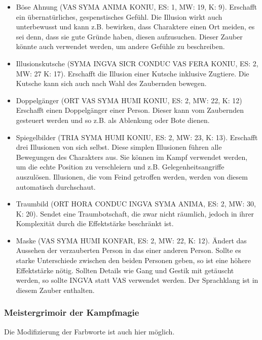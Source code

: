 \documentclass{article}
\begin{document}
\begin{itemize}
\item Böse Ahnung (VAS SYMA ANIMA KONIU, ES: 1, MW: 19, K: 9). Erschafft ein übernatürliches, gespenstisches Gefühl. Die Illusion wirkt auch unterbewusst und kann z.B. bewirken, dass Charaktere einen Ort meiden, es sei denn, dass sie gute Gründe haben, diesen aufzusuchen. Dieser Zauber könnte auch verwendet werden, um andere Gefühle zu beschreiben.
\item Illusionskutsche (SYMA INGVA SICR CONDUC VAS FERA KONIU, ES: 2, MW: 27 K: 17). Erschafft die Illusion einer Kutsche inklusive Zugtiere. Die Kutsche kann sich auch nach Wahl des Zaubernden bewegen.
\item Doppelgänger (ORT VAS SYMA HUMI KONIU, ES: 2, MW: 22, K: 12) Erschafft einen Doppelgänger einer Person. Dieser kann vom Zaubernden gesteuert werden und so z.B. als Ablenkung oder Bote dienen.
\item Spiegelbilder (TRIA SYMA HUMI KONIU, ES: 2, MW: 23, K: 13). Erschafft drei Illusionen von sich selbst. Diese simplen Illusionen führen alle Bewegungen des Charakters aus. Sie können im Kampf verwendet werden, um die echte Position zu verschleiern und z.B. Gelegenheitsangriffe auszulösen. Illusionen, die vom Feind getroffen werden, werden von diesem automatisch durchschaut.
\item Traumbild (ORT HORA CONDUC INGVA SYMA ANIMA, ES: 2, MW: 30, K: 20). Sendet eine Traumbotschaft, die zwar nicht räumlich, jedoch in ihrer Komplexität durch die Effektstärke beschränkt ist.
\item Maske (VAS SYMA HUMI KONFAR, ES: 2, MW: 22, K: 12). Ändert das Aussehen der verzauberten Person in das einer anderen Person. Sollte es starke Unterschiede zwischen den beiden Personen geben, so ist eine höhere Effektstärke nötig. Sollten Details wie Gang und Gestik mit getäuscht werden, so sollte INGVA statt VAS verwendet werden. Der Sprachklang ist in diesem Zauber enthalten.
\end{itemize}

\subsubsection{Meistergrimoir der Kampfmagie}

Die Modifizierung der Farbworte ist auch hier möglich.
\end{document}
